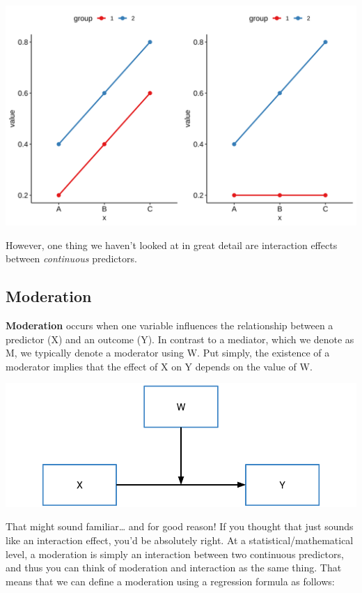 \documentclass[
]{book}
\begin{document}
\begin{center}\includegraphics{img/interaction_cat} \end{center}

However, one thing we haven't looked at in great detail are interaction effects between \emph{continuous} predictors.

\subsection{Moderation}\label{moderation}

\textbf{Moderation} occurs when one variable influences the relationship between a predictor (X) and an outcome (Y). In contrast to a mediator, which we denote as M, we typically denote a moderator using W. Put simply, the existence of a moderator implies that the effect of X on Y depends on the value of W.

\begin{center}\includegraphics{img/moderation_1} \end{center}

That might sound familiar\ldots{} and for good reason! If you thought that just sounds like an interaction effect, you'd be absolutely right. At a statistical/mathematical level, a moderation is simply an interaction between two continuous predictors, and thus you can think of moderation and interaction as the same thing. That means that we can define a moderation using a regression formula as follows:
\end{document}
